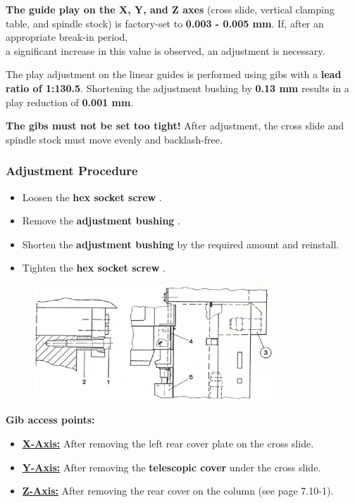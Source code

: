 \textbf{The guide play on the X, Y, and Z axes} (cross slide, vertical clamping table, and spindle stock) is factory-set to \textbf{0.003 - 0.005 mm}.  
If, after an appropriate break-in period,\\ a significant increase in this value is observed, an adjustment is necessary.

The play adjustment on the linear guides is performed using gibs with a \textbf{lead ratio of 1:130.5}.  
Shortening the adjustment bushing by \textbf{0.13 mm} results in a play reduction of \textbf{0.001 mm}\footnotemark[1].

\textbf{The gibs must not be set too tight!}  
After adjustment, the cross slide and spindle stock must move evenly and backlash-free.

\subsubsection*{Adjustment Procedure}
\begin{itemize}
    \item Loosen the \textbf{hex socket screw} .
    \item Remove the \textbf{adjustment bushing} .
    \item Shorten the \textbf{adjustment bushing}  by the required amount and reinstall.
    \item Tighten the \textbf{hex socket screw} .
\end{itemize}

\begin{figure}[H]
    \centering
    \includegraphics[width=0.8\textwidth]{images/chapter7/gib_adjustment_diagram.jpg}
    \label{fig:gib_adjustment}
\end{figure}

\textbf{Gib access points:}
\begin{itemize}
    \item \textbf{\underline{X-Axis:}} After removing the left rear cover plate  on the cross slide.
    \item \textbf{\underline{Y-Axis:}} After removing the \textbf{telescopic cover}  under the cross slide.
    \item \textbf{\underline{Z-Axis:}} After removing the rear cover  on the column (see page 7.10-1).
\end{itemize}


